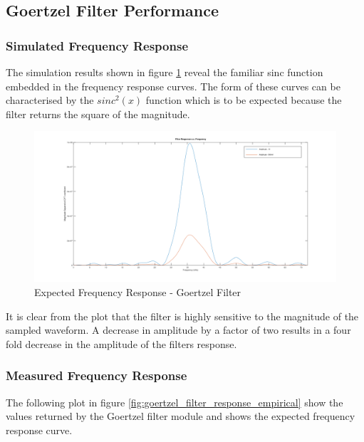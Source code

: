 \subsection{Goertzel Filter Performance}

\subsubsection{Simulated Frequency Response}

The simulation results shown in figure \ref{fig:goertzel_filter_response_simulated} reveal the familiar sinc function embedded in the frequency response curves. The form of these curves can be characterised by the $sinc^2(x)$ function which is to be expected because the filter returns the square of the magnitude.

\begin{figure}[H]
	\centering
	\includegraphics[width=\linewidth]{figures/results/goertzel_filter_simulation_wide.png}
	\caption{Expected Frequency Response - Goertzel Filter}
	\label{fig:goertzel_filter_response_simulated}
\end{figure}

It is clear from the plot that the filter is highly sensitive to the magnitude of the sampled waveform. A decrease in amplitude by a factor of two results in a four fold decrease in the amplitude of the filters response.


\subsubsection{Measured Frequency Response}

The following plot in figure \ref{fig:goertzel_filter_response_empirical} show the values returned by the Goertzel filter module and shows the expected frequency response curve.

